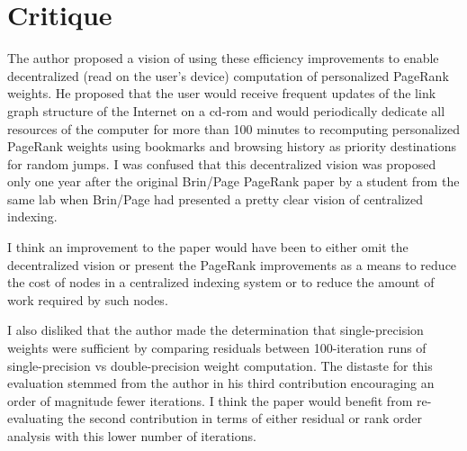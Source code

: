 \documentclass[a4paper,11pt]{article}
\theoremstyle{mytheor}
\begin{document}
\section*{Critique}

The author proposed a vision of using these efficiency improvements to enable decentralized (read on the user's device) computation of personalized PageRank weights. He proposed that the user would receive frequent updates of the link graph structure of the Internet on a cd-rom and would periodically dedicate all resources of the computer for more than 100 minutes to recomputing personalized PageRank weights using bookmarks and browsing history as priority destinations for random jumps. I was confused that this decentralized vision was proposed only one year after the original Brin/Page PageRank paper by a student from the same lab when Brin/Page had presented a pretty clear vision of centralized indexing.

I think an improvement to the paper would have been to either omit the decentralized vision or present the PageRank improvements as a means to reduce the cost of nodes in a centralized indexing system or to reduce the amount of work required by such nodes.

I also disliked that the author made the determination that single-precision weights were sufficient by comparing residuals between 100-iteration runs of single-precision vs double-precision weight computation. The distaste for this evaluation stemmed from the author in his third contribution encouraging an order of magnitude fewer iterations. I think the paper would benefit from re-evaluating the second contribution in terms of either residual or rank order analysis with this lower number of iterations.
\end{document}
